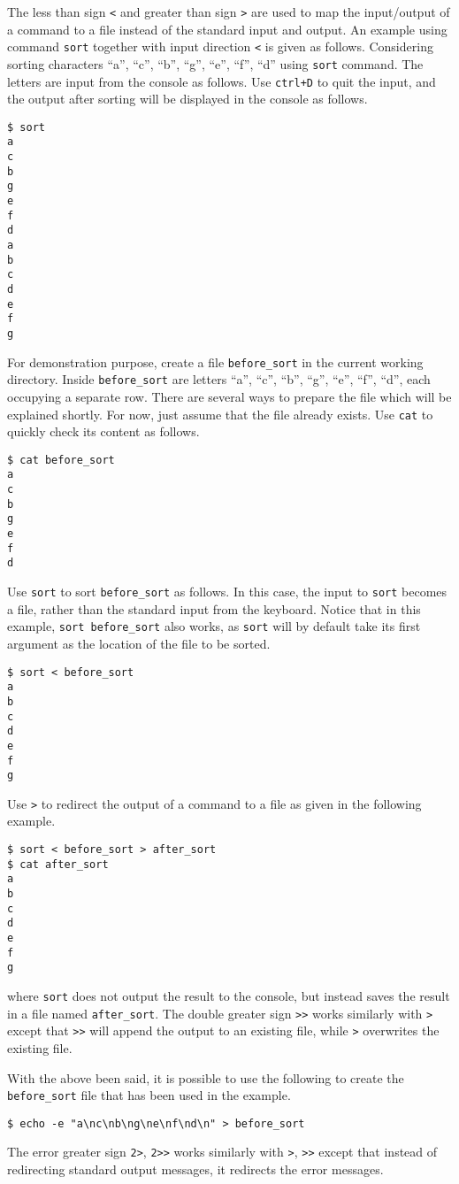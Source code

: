 The less than sign \verb|<| and greater than sign \verb|>| are used to map the input/output of a command to a file instead of the standard input and output. An example using command \verb|sort| together with input direction \verb|<| is given as follows. Considering sorting characters ``a'', ``c'', ``b'', ``g'', ``e'', ``f'', ``d'' using \verb|sort| command. The letters are input from the console as follows. Use \verb|ctrl+D| to quit the input, and the output after sorting will be displayed in the console as follows.
\begin{lstlisting}
$ sort
a
c
b
g
e
f
d
a
b
c
d
e
f
g
\end{lstlisting}
For demonstration purpose, create a file \verb|before_sort| in the current working directory. Inside \verb|before_sort| are letters ``a'', ``c'', ``b'', ``g'', ``e'', ``f'', ``d'', each occupying a separate row. There are several ways to prepare the file which will be explained shortly. For now, just assume that the file already exists. Use \verb|cat| to quickly check its content as follows.
\begin{lstlisting}
$ cat before_sort
a
c
b
g
e
f
d
\end{lstlisting}

Use \verb|sort| to sort \verb|before_sort| as follows. In this case, the input to \verb|sort| becomes a file, rather than the standard input from the keyboard. Notice that in this example, \verb|sort before_sort| also works, as \verb|sort| will by default take its first argument as the location of the file to be sorted.
\begin{lstlisting}
$ sort < before_sort
a
b
c
d
e
f
g
\end{lstlisting}

Use \verb|>| to redirect the output of a command to a file as given in the following example.
\begin{lstlisting}
$ sort < before_sort > after_sort
$ cat after_sort
a
b
c
d
e
f
g
\end{lstlisting}
where \verb|sort| does not output the result to the console, but instead saves the result in a file named \verb|after_sort|. The double greater sign \verb|>>| works similarly with \verb|>| except that \verb|>>| will append the output to an existing file, while \verb|>| overwrites the existing file.

With the above been said, it is possible to use the following to create the \verb|before_sort| file that has been used in the example.
\begin{lstlisting}
$ echo -e "a\nc\nb\ng\ne\nf\nd\n" > before_sort
\end{lstlisting}

The error greater sign \verb|2>|, \verb|2>>| works similarly with \verb|>|, \verb|>>| except that instead of redirecting standard output messages, it redirects the error messages.




